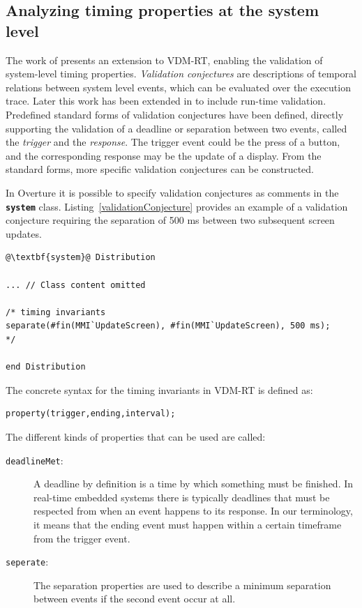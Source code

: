 \documentclass{overturerepchap}
\begin{document}
\subsection*{Analyzing timing properties at the system level}

The work of\cite{Fitzgerald&07b} presents an extension to VDM-RT, enabling the validation of system-level timing properties. \textit{Validation conjectures} are descriptions of temporal relations between system level events, which can be evaluated over the execution trace. Later this work has been extended in\cite{Ribeiro&11} to include run-time validation. Predefined standard forms of validation conjectures have been defined, directly supporting the validation of a deadline or separation between two events, called the \textit{trigger} and the \textit{response}. The trigger event could be the press of a button, and the corresponding response may be the update of a display. From the standard forms, more specific validation conjectures can be constructed.

In Overture it is possible to specify validation conjectures as comments in the \textbf{\texttt{system}} class. Listing~\ref{validationConjecture} provides an example of a validation conjecture requiring the separation of 500 ms between two subsequent screen updates.

\begin{lstlisting}[language=VDM++,label=validationConjecture,caption=Validation conjecture example,captionpos=b,escapechar=@]
@\textbf{system}@ Distribution

... // Class content omitted

/* timing invariants
separate(#fin(MMI`UpdateScreen), #fin(MMI`UpdateScreen), 500 ms);
*/

end Distribution
\end{lstlisting}

The concrete syntax for the timing invariants in VDM-RT is defined as:
\begin{lstlisting}
property(trigger,ending,interval);
\end{lstlisting}

The different kinds of properties that can be used are called:

\begin{description}
\item[\texttt{deadlineMet}:] A deadline by definition is a time by which something must be finished. In real-time embedded systems there is typically deadlines that must be respected from when an event happens to its response. In our terminology, it means that the ending event must happen within a certain timeframe from the trigger event.
\item[\texttt{seperate}:] The separation properties are used to describe a minimum separation between events if the second event occur at all.
\end{description}
\end{document}
